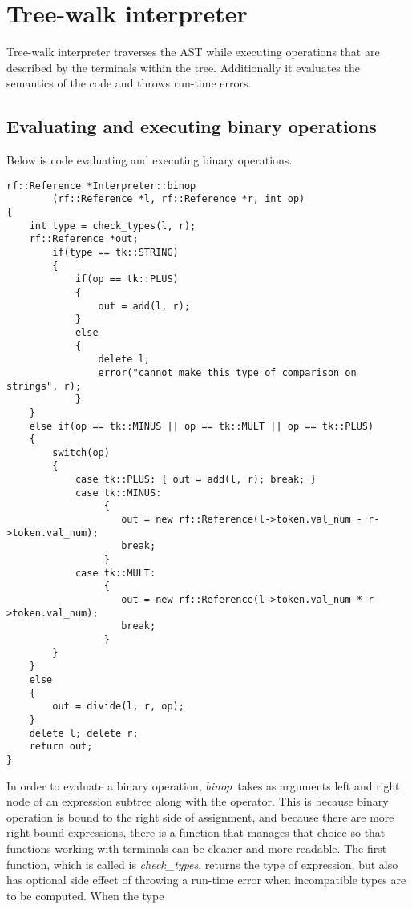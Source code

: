 \documentclass{article}
\begin{document}
\section{Tree-walk interpreter}

    Tree-walk interpreter traverses the AST while executing operations that 
    are described by the terminals within the tree. Additionally it evaluates
    the semantics of the code and throws run-time errors.

\subsection{Evaluating and executing binary operations}

    Below is code evaluating and executing binary operations.

    \begin{verbatim}
rf::Reference *Interpreter::binop
        (rf::Reference *l, rf::Reference *r, int op)
{
    int type = check_types(l, r);
    rf::Reference *out;
        if(type == tk::STRING)
        {
            if(op == tk::PLUS)
            { 
                out = add(l, r);
            }
            else
            { 
                delete l;
                error("cannot make this type of comparison on strings", r);
            }
    }
    else if(op == tk::MINUS || op == tk::MULT || op == tk::PLUS)
    {
        switch(op)
        {
            case tk::PLUS: { out = add(l, r); break; }
            case tk::MINUS:
                 {
                    out = new rf::Reference(l->token.val_num - r->token.val_num); 
                    break;
                 }
            case tk::MULT: 
                 {
                    out = new rf::Reference(l->token.val_num * r->token.val_num); 
                    break;
                 }
        }
    }
    else
    {
        out = divide(l, r, op);
    }
    delete l; delete r;
    return out;
}
    \end{verbatim}
    In order to evaluate a binary operation, \emph{binop} takes as arguments 
    left and right node of an expression subtree along with the operator. This 
    is because binary operation is bound to the right side of assignment, and 
    because there are more right-bound expressions, there is a function that 
    manages that choice so that functions working with terminals can be cleaner 
    and more readable. The first function, which is called is \emph{check\_types}, 
    returns the type of expression, but also has optional side effect of throwing 
    a run-time error when incompatible types are to be computed. When the type 
\end{document}
